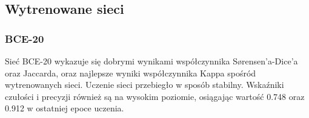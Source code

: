 \subsection{Wytrenowane sieci}
\label{sec:trained-nets}


\subsubsection{BCE-20}

\par
Sieć BCE-20 wykazuje się dobrymi wynikami współczynnika Sørensen'a-Dice'a oraz Jaccarda, oraz najlepsze wyniki współczynnika Kappa spośród wytrenowanych sieci. Uczenie sieci przebiegło w sposób stabilny. Wskaźniki czułości i precyzji również są na wysokim poziomie, osiągając wartość 0.748 oraz 0.912 w ostatniej epoce uczenia.






